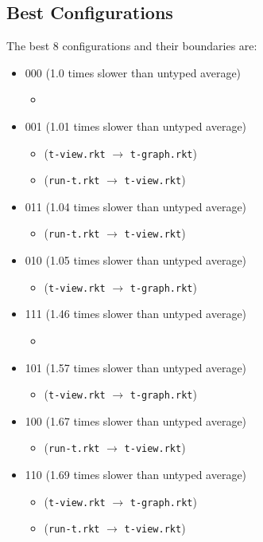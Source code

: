 \documentclass{article}
\newcommand{\mono}[1]{\texttt{#1}}
\begin{document}
\subsection{Best Configurations}
The best 8 configurations and their boundaries are:
\begin{itemize}
\item 000 (1.0 times slower than untyped average)
  \begin{itemize}
  \item 
  \end{itemize}
\item 001 (1.01 times slower than untyped average)
  \begin{itemize}
  \item (\mono{t-view.rkt} $\rightarrow$ \mono{t-graph.rkt})
  \item (\mono{run-t.rkt} $\rightarrow$ \mono{t-view.rkt})
  \end{itemize}
\item 011 (1.04 times slower than untyped average)
  \begin{itemize}
  \item (\mono{run-t.rkt} $\rightarrow$ \mono{t-view.rkt})
  \end{itemize}
\item 010 (1.05 times slower than untyped average)
  \begin{itemize}
  \item (\mono{t-view.rkt} $\rightarrow$ \mono{t-graph.rkt})
  \end{itemize}
\item 111 (1.46 times slower than untyped average)
  \begin{itemize}
  \item 
  \end{itemize}
\item 101 (1.57 times slower than untyped average)
  \begin{itemize}
  \item (\mono{t-view.rkt} $\rightarrow$ \mono{t-graph.rkt})
  \end{itemize}
\item 100 (1.67 times slower than untyped average)
  \begin{itemize}
  \item (\mono{run-t.rkt} $\rightarrow$ \mono{t-view.rkt})
  \end{itemize}
\item 110 (1.69 times slower than untyped average)
  \begin{itemize}
  \item (\mono{t-view.rkt} $\rightarrow$ \mono{t-graph.rkt})
  \item (\mono{run-t.rkt} $\rightarrow$ \mono{t-view.rkt})
  \end{itemize}


\end{itemize}
\end{document}
